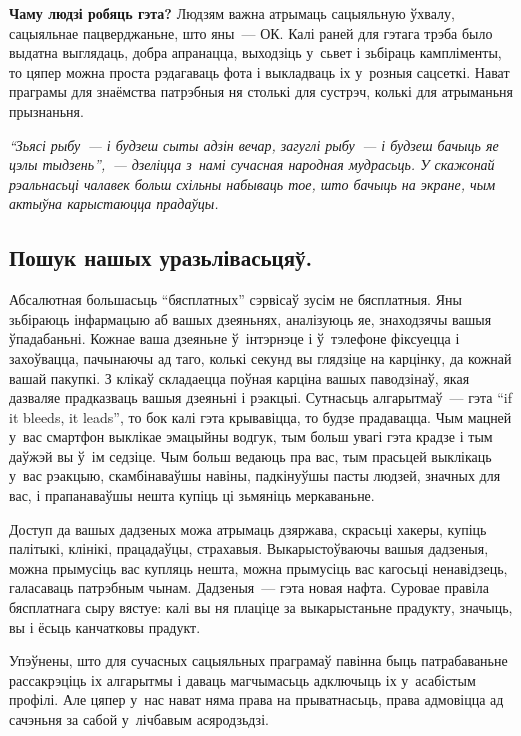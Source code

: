 \textbf{Чаму людзі робяць гэта?} Людзям важна атрымаць сацыяльную ўхвалу, сацыяльнае пацверджаньне, што яны~--- ОК. Калі раней для гэтага трэба было выдатна выглядаць, добра апранацца, выходзіць у~сьвет і зьбіраць кампліменты, то цяпер можна проста рэдагаваць фота і выкладваць іх у~розныя сацсеткі. Нават праграмы для знаёмства патрэбныя ня столькі для сустрэч, колькі для атрыманьня прызнаньня.

\emph{``Зьясі рыбу~--- і будзеш сыты адзін вечар, загуглі рыбу~--- і будзеш бачыць яе цэлы тыдзень'',~--- дзеліцца з~намі сучасная народная мудрасьць. У скажонай рэальнасьці чалавек больш схільны набываць тое, што бачыць на экране, чым актыўна карыстаюцца прадаўцы.}

\subsection*{Пошук нашых уразьлівасьцяў.}

Абсалютная большасьць ``бясплатных'' сэрвісаў зусім не бясплатныя. Яны зьбіраюць інфармацыю аб вашых дзеяньнях, аналізуюць яе, знаходзячы вашыя ўпадабаньні. Кожнае ваша дзеяньне ў~інтэрнэце і ў~тэлефоне фіксуецца і захоўвацца, пачынаючы ад таго, колькі секунд вы глядзіце на карцінку, да кожнай вашай пакупкі. З клікаў складаецца поўная карціна вашых паводзінаў, якая дазваляе прадказваць вашыя дзеяньні і рэакцыі. Сутнасьць алгарытмаў~--- гэта ``if it bleeds, it leads'', то бок калі гэта крывавіцца, то будзе прадавацца. Чым мацней у~вас смартфон выклікае эмацыйны водгук, тым больш увагі гэта крадзе і тым даўжэй вы ў~ім седзіце. Чым больш ведаюць пра вас, тым прасьцей выклікаць у~вас рэакцыю, скамбінаваўшы навіны, падкінуўшы пасты людзей, значных для вас, і прапанаваўшы нешта купіць ці зьмяніць меркаваньне.

Доступ да вашых дадзеных можа атрымаць дзяржава, скрасьці хакеры, купіць палітыкі, клінікі, працадаўцы, страхавыя. Выкарыстоўваючы вашыя дадзеныя, можна прымусіць вас купляць нешта, можна прымусіць вас кагосьці ненавідзець, галасаваць патрэбным чынам. Дадзеныя~--- гэта новая нафта. Суровае правіла бясплатнага сыру вястуе: калі вы ня плаціце за выкарыстаньне прадукту, значыць, вы і ёсьць канчатковы прадукт.


Упэўнены, што для сучасных сацыяльных праграмаў павінна быць патрабаваньне рассакрэціць іх алгарытмы і даваць магчымасьць адключыць іх у~асабістым профілі. Але цяпер у~нас нават няма права на прыватнасьць, права адмовіцца ад сачэньня за сабой у~лічбавым асяродзьдзі.

